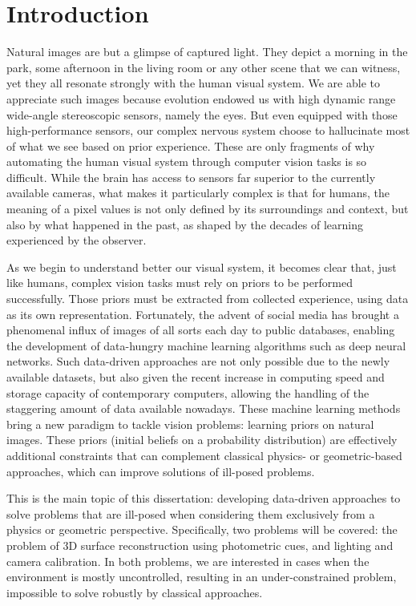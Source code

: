 \chapter*{Introduction}         %

Natural images are but a glimpse of captured light. They depict a morning in the park, some afternoon in the living room or any other scene that we can witness, yet they all resonate strongly with the human visual system. We are able to appreciate such images because evolution endowed us with high dynamic range wide-angle stereoscopic sensors, namely the eyes. But even equipped with those high-performance sensors, our complex nervous system choose to hallucinate most of what we see based on prior experience. These are only fragments of why automating the human visual system through computer vision tasks is so difficult. While the brain has access to sensors far superior to the currently available cameras, what makes it particularly complex is that for humans, the meaning of a pixel values is not only defined by its surroundings and context, but also by what happened in the past, as shaped by the decades of learning experienced by the observer.

As we begin to understand better our visual system, it becomes clear that, just like humans, complex vision tasks must rely on priors to be performed successfully. Those priors must be extracted from collected experience, using data as its own representation. Fortunately, the advent of social media has brought a phenomenal influx of images of all sorts each day to public databases, enabling the development of data-hungry machine learning algorithms such as deep neural networks. Such data-driven approaches are not only possible due to the newly available datasets, but also given the recent increase in computing speed and storage capacity of contemporary computers, allowing the handling of the staggering amount of data available nowadays. These machine learning methods bring a new paradigm to tackle vision problems: learning priors on natural images. These priors (initial beliefs on a probability distribution) are effectively additional constraints that can complement classical physics- or geometric-based approaches, which can improve solutions of ill-posed problems.

This is the main topic of this dissertation: developing data-driven approaches to solve problems that are ill-posed when considering them exclusively from a physics or geometric perspective. Specifically, two problems will be covered: the problem of 3D surface reconstruction using photometric cues, and lighting and camera calibration. In both problems, we are interested in cases when the environment is mostly uncontrolled, resulting in an under-constrained problem, impossible to solve robustly by classical approaches.

